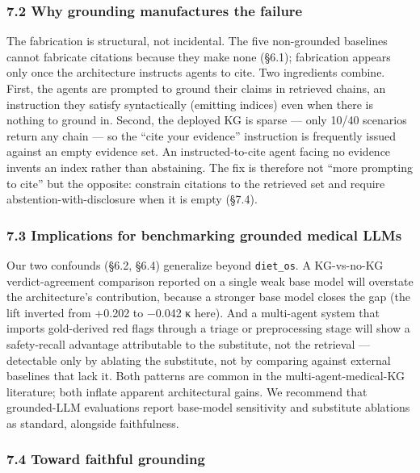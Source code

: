 \documentclass[
]{article}
\begin{document}
\hypertarget{why-grounding-manufactures-the-failure}{%
\subsubsection{7.2 Why grounding manufactures the
failure}\label{why-grounding-manufactures-the-failure}}

The fabrication is structural, not incidental. The five non-grounded
baselines cannot fabricate citations because they make none (§6.1);
fabrication appears only once the architecture instructs agents to cite.
Two ingredients combine. First, the agents are prompted to ground their
claims in retrieved chains, an instruction they satisfy syntactically
(emitting indices) even when there is nothing to ground in. Second, the
deployed KG is sparse --- only 10/40 scenarios return any chain --- so
the ``cite your evidence'' instruction is frequently issued against an
empty evidence set. An instructed-to-cite agent facing no evidence
invents an index rather than abstaining. The fix is therefore not ``more
prompting to cite'' but the opposite: constrain citations to the
retrieved set and require abstention-with-disclosure when it is empty
(§7.4).

\hypertarget{implications-for-benchmarking-grounded-medical-llms}{%
\subsubsection{7.3 Implications for benchmarking grounded medical
LLMs}\label{implications-for-benchmarking-grounded-medical-llms}}

Our two confounds (§6.2, §6.4) generalize beyond \texttt{diet\_os}. A
KG-vs-no-KG verdict-agreement comparison reported on a single weak base
model will overstate the architecture's contribution, because a stronger
base model closes the gap (the lift inverted from +0.202 to −0.042 κ
here). And a multi-agent system that imports gold-derived red flags
through a triage or preprocessing stage will show a safety-recall
advantage attributable to the substitute, not the retrieval ---
detectable only by ablating the substitute, not by comparing against
external baselines that lack it. Both patterns are common in the
multi-agent-medical-KG literature; both inflate apparent architectural
gains. We recommend that grounded-LLM evaluations report base-model
sensitivity and substitute ablations as standard, alongside
faithfulness.

\hypertarget{toward-faithful-grounding}{%
\subsubsection{7.4 Toward faithful
grounding}\label{toward-faithful-grounding}}
\end{document}
